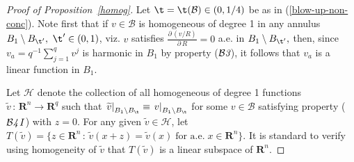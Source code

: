 \documentclass[a4paper,11pt]{amsart}
\begin{document}
\begin{proof}[Proof of Proposition~\ref{homog}]
Let $\t = \t({\mathcal B}) \in (0, 1/4)$ be as in (\ref{blow-up-non-conc}). Note first that if $v \in {\mathcal B}$  is homogeneous of degree 1 in any annulus $B_{1}\setminus B_{\t^{\prime}},$ $\t^{\prime} \in (0, 1)$, viz. $v$ satisfies $\frac{\partial \, \left(v/R\right)}{\partial \, R} = 0$ a.e. in $B_{1} \setminus B_{\t^{\prime}},$ then, since $v_{a} = q^{-1} \sum_{j=1}^{q} v^{j}$ is harmonic  in $B_{1}$ by property (${\mathcal B{\emph 3}}$), it follows that $v_{a}$ is a linear function in $B_{1}.$ 


Let ${\mathcal H}$ denote the collection of all homogeneous of degree 1 functions $\widetilde{v} \, : \, {\mathbf R}^{n} \to {\mathbf R}^{q}$ such that $\left.\widetilde{v}\right|_{B_{1} \setminus B_{\t}} \equiv \left.v\right|_{B_{1} \setminus B_{\t}}$ for some $v \in {\mathcal B}$ satisfying property (${\mathcal B}{\emph 4 \, I}$) with $z = 0.$ For any given $\widetilde{v} \in {\mathcal H}$, 
let $T(\widetilde{v}) = \{z \in {\mathbf R}^{n} \, : \, \widetilde{v}(x + z) = \widetilde{v}(x) \; \mbox{for a.e.} \; x \in {\mathbf R}^{n}\}.$ It is standard to verify using homogeneity of $\widetilde{v}$ that $T(\widetilde{v})$ is a linear subspace of ${\mathbf R}^{n}.$



\end{proof}
\end{document}
